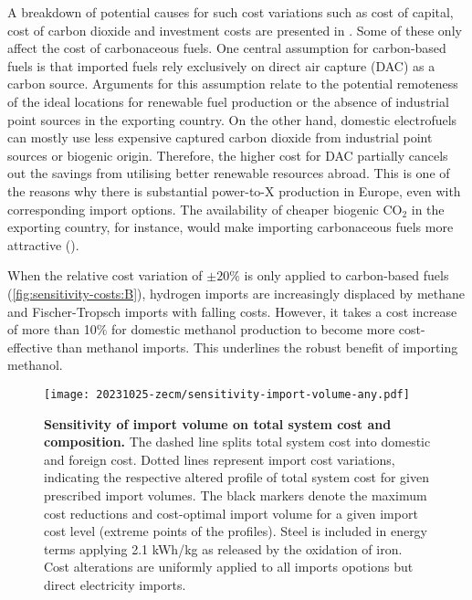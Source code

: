 A breakdown of potential causes for such cost variations such as cost of
capital, cost of carbon dioxide and investment costs are presented in
. Some of these only affect the cost of
carbonaceous fuels. One central assumption for carbon-based fuels is that
imported fuels rely exclusively on direct air capture (DAC) as a carbon source.
Arguments for this assumption relate to the potential remoteness of the ideal
locations for renewable fuel production or the absence of industrial point
sources in the exporting country. On the other hand, domestic electrofuels can
mostly use less expensive captured carbon dioxide from industrial point sources
or biogenic origin. Therefore, the higher cost for DAC partially cancels out the
savings from utilising better renewable resources abroad. This is one of the
reasons why there is substantial power-to-X production in Europe, even with
corresponding import options. The availability of cheaper biogenic CO$_2$ in the
exporting country, for instance, would make importing carbonaceous fuels more
attractive ().

When the relative cost variation of $\pm 20\%$ is only applied to carbon-based
fuels (\cref{fig:sensitivity-costs:B}), hydrogen imports are increasingly
displaced by methane and Fischer-Tropsch imports with falling costs. However, it
takes a cost increase of more than 10\% for domestic methanol production to
become more cost-effective than methanol imports. This underlines the robust
benefit of importing methanol.


\begin{figure*}
    \texttt{[image: 20231025-zecm/sensitivity-import-volume-any.pdf]}
    \caption{\textbf{Sensitivity of import volume on total system cost and composition.}
        The dashed line splits total system cost into domestic and foreign cost.
        Dotted lines represent import cost variations, indicating the respective
        altered profile of total system cost for given prescribed import
        volumes. The black markers denote the maximum cost reductions and
        cost-optimal import volume for a given import cost level (extreme points
        of the profiles). Steel is included in energy terms applying 2.1 kWh/kg
        as released by the oxidation of iron. Cost alterations are uniformly
        applied to all imports opotions but direct electricity imports. }
    \label{fig:sensitivity-volume}
\end{figure*}


